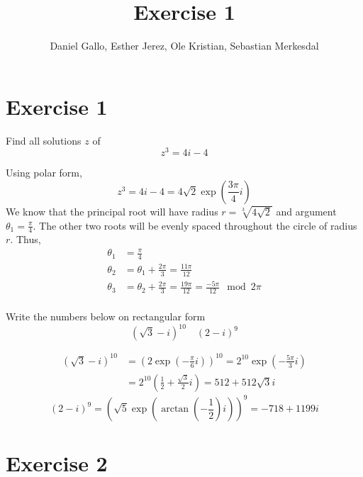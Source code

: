 \documentclass{report}
\title{Exercise 1}
\author{Daniel Gallo, Esther Jerez, Ole Kristian, Sebastian Merkesdal}
\renewcommand{\exp}[1]{\operatorname{exp} \left(#1\right)}
\renewcommand{\arctan}[1]{\operatorname{arctan} \left(#1\right)}
\begin{document}
    \maketitle
    
    \section*{Exercise 1}
    \begin{tcolorbox}[title=Part a]
        Find all solutions $z$ of
        \begin{equation*}
            z^3 = 4i - 4
        \end{equation*}
    \end{tcolorbox}
    \noindent
    Using polar form,
    \begin{equation*}
        z^3 = 4i - 4 = 4\sqrt{2}\exp{\frac{3\pi}{4}i}
    \end{equation*}
    We know that the principal root will have radius $r = \sqrt[3]{4\sqrt{2}}$ and argument $\theta_1 = \frac{\pi}{4}$. The other two roots will be evenly spaced throughout the circle of radius $r$. Thus,
    \begin{align*}
        \theta_1 &= \frac{\pi}{4} \\
        \theta_2 &= \theta_1 + \frac{2\pi}{3} = \frac{11\pi}{12} \\
        \theta_3 &= \theta_2 + \frac{2\pi}{3} = \frac{19\pi}{12} = \frac{-5\pi}{12} \mod{2\pi}\\
    \end{align*}
    \begin{tcolorbox}[title=Part b]
        Write the numbers below on rectangular form
        \begin{equation*}
            (\sqrt{3} - i)^{10} \quad (2 - i)^{9}
        \end{equation*}
    \end{tcolorbox}
    \begin{align*}
        (\sqrt{3} - i)^{10} &= \left(2\exp{-\frac{\pi}{6}i}\right)^{10} = 2^{10}\exp{-\frac{5\pi}{3}i} \\
        &= 2^{10}\left(\frac{1}{2} + \frac{\sqrt{3}}{2}i\right) = 512 + 512\sqrt{3}i
    \end{align*}
    \begin{equation*}
        (2 - i)^{9} = \left(\sqrt{5}\exp{\arctan{-\frac{1}{2}}i}\right)^{9} = -718 + 1199i
    \end{equation*}
    \section*{Exercise 2}
    
\end{document}

